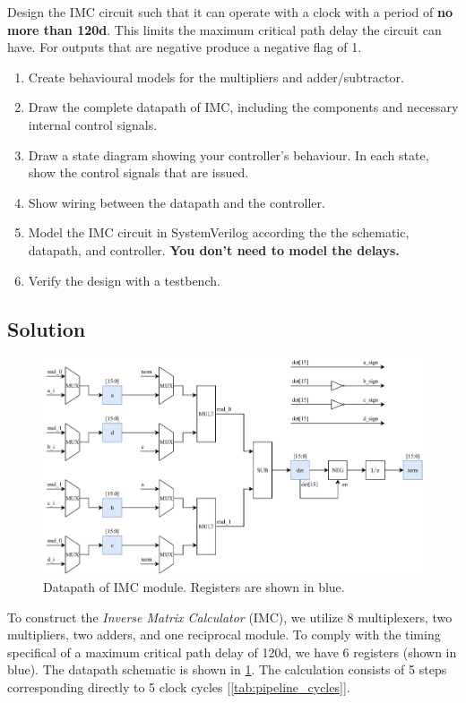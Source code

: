 \documentclass[../main.tex]{subfiles}
\begin{document}
Design the IMC circuit such that it can operate with a clock with a period of \textbf{no more than 120d}. This limits the maximum critical path delay the circuit can have. For outputs that are negative produce a negative flag of 1.

\begin{enumerate}
    \item Create behavioural models for the multipliers and adder/subtractor.
    \item Draw the complete datapath of IMC, including the components and necessary internal control signals.
    \item Draw a state diagram showing your controller's behaviour. In each state, show the control signals that are issued.
    \item Show wiring between the datapath and the controller.
    \item Model the IMC circuit in SystemVerilog according the the schematic, datapath, and controller. \textbf{You don't need to model the delays.}
    \item Verify the design with a testbench.
\end{enumerate}

\newpage

\subsection*{Solution}

\begin{figure}[h]
    \centering
    \includegraphics[width=\linewidth]{assets/q1.png}
    \caption{Datapath of IMC module. Registers are shown in blue.}
    \label{fig:q1_dp}
\end{figure}

To construct the \textit{Inverse Matrix Calculator} (IMC), we utilize 8 multiplexers, two multipliers, two adders, and one reciprocal module. To comply with the timing specifical of a maximum critical path delay of 120d, we have 6 registers (shown in blue). The datapath schematic is shown in \cref{fig:q1_dp}. The calculation consists of 5 steps corresponding directly to 5 clock cycles [\cref{tab:pipeline_cycles}].
\end{document}

